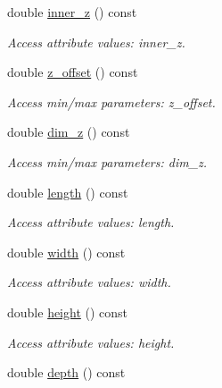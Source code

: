 \begin{DoxyCompactItemize}
double \hyperlink{struct_d_d4hep_1_1_x_m_l_1_1_child_value_a6472bfae1581781385383c48678a75b4}{inner\_\-z} () const 
\begin{DoxyCompactList}\small\item\em Access attribute values: inner\_\-z. \item\end{DoxyCompactList}\item 
double \hyperlink{struct_d_d4hep_1_1_x_m_l_1_1_child_value_a69106e2cc99679b1163d53be3cdef46c}{z\_\-offset} () const 
\begin{DoxyCompactList}\small\item\em Access min/max parameters: z\_\-offset. \item\end{DoxyCompactList}\item 
double \hyperlink{struct_d_d4hep_1_1_x_m_l_1_1_child_value_a7bdb25610e0b848e980022a86d2f43cf}{dim\_\-z} () const 
\begin{DoxyCompactList}\small\item\em Access min/max parameters: dim\_\-z. \item\end{DoxyCompactList}\item 
double \hyperlink{struct_d_d4hep_1_1_x_m_l_1_1_child_value_aaacd385c7454cbb1a8bc6bfb6cd2b7dd}{length} () const 
\begin{DoxyCompactList}\small\item\em Access attribute values: length. \item\end{DoxyCompactList}\item 
double \hyperlink{struct_d_d4hep_1_1_x_m_l_1_1_child_value_a54e4d943f363b30d71d263480f615cc7}{width} () const 
\begin{DoxyCompactList}\small\item\em Access attribute values: width. \item\end{DoxyCompactList}\item 
double \hyperlink{struct_d_d4hep_1_1_x_m_l_1_1_child_value_a33bfe097d6727dd33e1b081f9695bcb3}{height} () const 
\begin{DoxyCompactList}\small\item\em Access attribute values: height. \item\end{DoxyCompactList}\item 
double \hyperlink{struct_d_d4hep_1_1_x_m_l_1_1_child_value_ade9c12c3182b16cf12398551cc7be4f1}{depth} () const 

\end{DoxyCompactItemize}
